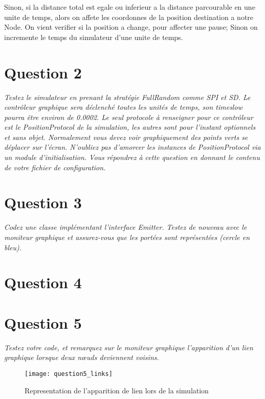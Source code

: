 \documentclass[11pt,a4paper,sans]{report}
\begin{document}
	Sinon, si la distance total est egale ou inferieur a la distance parcourable en une unite de temps, alors on affete les coordonnes de la position destination a notre Node.  On vient verifier si la position a change, pour affecter une pause; Sinon on incremente le temps du simulateur d'une unite de temps.

	\section{Question 2}
	\textit{Testez le simulateur en prenant la stratégie FullRandom comme SPI et SD. Le contrôleur graphique sera déclenché toutes les unités de temps, son timeslow pourra être environ de 0.0002. Le seul protocole à renseigner pour ce contrôleur est le PositionProtocol de la simulation, les autres sont pour l’instant optionnels et sans objet.  Normalement vous devez voir graphiquement des points verts se déplacer sur l’écran.  N’oubliez pas d’amorcer les instances de PositionProtocol via un module d’initialisation. Vous répondrez à cette question en donnant le contenu de votre fichier de configuration.}

	\newpage
	\section{Question 3}
	\textit{Codez une classe implémentant l’interface Emitter. Testez de nouveau avec le moniteur graphique et assurez-vous que les portées sont représentées (cercle en bleu).}


	\section{Question 4}

	\section{Question 5}
	\par\textit{Testez votre code, et remarquez sur le moniteur graphique l’apparition d’un lien graphique lorsque deux nœuds deviennent voisins.}
	\begin{figure}[h]
		\centering
		\texttt{[image: question5\_links]}
		\caption{Representation de l'apparition de lien lors de la simulation}
	\end{figure}
\end{document}
